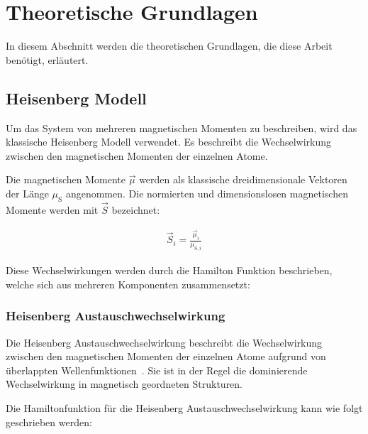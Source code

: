 \documentclass[main.tex]{subfiles}
\begin{document}
\newpage
\section{Theoretische Grundlagen}
In diesem Abschnitt werden die theoretischen Grundlagen, die diese Arbeit
benötigt, erläutert.

\subsection{Heisenberg Modell}

Um das System von mehreren magnetischen Momenten zu beschreiben, wird das
klassische Heisenberg Modell verwendet. Es beschreibt die Wechselwirkung
zwischen den magnetischen Momenten der einzelnen Atome.

Die magnetischen Momente \(\vec{\mu}\) werden als klassische dreidimensionale
Vektoren der Länge
\(\mu_{\text{S}}\) angenommen.
Die normierten und dimensionslosen magnetischen Momente werden mit \(\vec{S}\)
bezeichnet:

\begin{align}
	\vec{S}_i = \frac{\vec{\mu}_i}{\mu_{\text{S},i}}
\end{align}


Diese Wechselwirkungen werden durch die Hamilton Funktion beschrieben, welche
sich aus mehreren Komponenten zusammensetzt:

\subsubsection*{Heisenberg Austauschwechselwirkung}

Die Heisenberg Austauschwechselwirkung beschreibt die Wechselwirkung zwischen
den magnetischen Momenten der einzelnen Atome aufgrund von überlappten
Wellenfunktionen~\cite{Heisenberg-Ferromagnetismus}. Sie ist in der Regel die
dominierende Wechselwirkung in magnetisch geordneten Strukturen.


Die Hamiltonfunktion für die Heisenberg Austauschwechselwirkung kann wie folgt
geschrieben werden:
\end{document}
